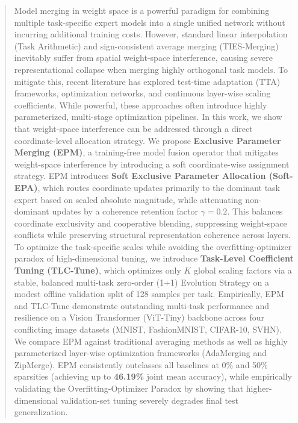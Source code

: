 \begin{abstract}
Model merging in weight space is a powerful paradigm for combining multiple task-specific expert models into a single unified network without incurring additional training costs. However, standard linear interpolation (Task Arithmetic) and sign-consistent average merging (TIES-Merging) inevitably suffer from spatial weight-space interference, causing severe representational collapse when merging highly orthogonal task models. To mitigate this, recent literature has explored test-time adaptation (TTA) frameworks, optimization networks, and continuous layer-wise scaling coefficients. While powerful, these approaches often introduce highly parameterized, multi-stage optimization pipelines. In this work, we show that weight-space interference can be addressed through a direct coordinate-level allocation strategy. We propose \textbf{Exclusive Parameter Merging (EPM)}, a training-free model fusion operator that mitigates weight-space interference by introducing a soft coordinate-wise assignment strategy. EPM introduces \textbf{Soft Exclusive Parameter Allocation (Soft-EPA)}, which routes coordinate updates primarily to the dominant task expert based on scaled absolute magnitude, while attenuating non-dominant updates by a coherence retention factor $\gamma = 0.2$. This balances coordinate exclusivity and cooperative blending, suppressing weight-space conflicts while preserving structural representation coherence across layers. To optimize the task-specific scales while avoiding the overfitting-optimizer paradox of high-dimensional tuning, we introduce \textbf{Task-Level Coefficient Tuning (TLC-Tune)}, which optimizes only $K$ global scaling factors via a stable, balanced multi-task zero-order (1+1) Evolution Strategy on a modest offline validation split of 128 samples per task. Empirically, EPM and TLC-Tune demonstrate outstanding multi-task performance and resilience on a Vision Transformer (ViT-Tiny) backbone across four conflicting image datasets (MNIST, FashionMNIST, CIFAR-10, SVHN). We compare EPM against traditional averaging methods as well as highly parameterized layer-wise optimization frameworks (AdaMerging and ZipMerge). EPM consistently outclasses all baselines at 0\% and 50\% sparsities (achieving up to \textbf{46.19\%} joint mean accuracy), while empirically validating the Overfitting-Optimizer Paradox by showing that higher-dimensional validation-set tuning severely degrades final test generalization.
\end{abstract}
